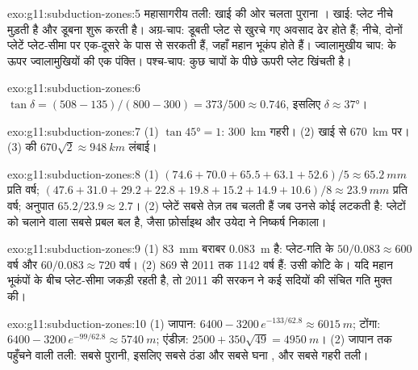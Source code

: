 \begin{solution}{exo:g11:subduction-zones:5}
महासागरीय तली: खाई की ओर चलता पुराना । खाई: प्लेट नीचे मुड़ती है
और डूबना शुरू करती है। अग्र-चाप: डूबती प्लेट से खुरचे गए अवसाद ढेर
होते हैं; नीचे, दोनों प्लेटें प्लेट-सीमा पर एक-दूसरे के पास से सरकती हैं,
जहाँ महान भूकंप होते हैं। ज्वालामुखीय चाप:  के ऊपर ज्वालामुखियों की
एक पंक्ति। पश्च-चाप: कुछ चापों के पीछे ऊपरी प्लेट खिंचती है।
\end{solution}

\begin{solution}{exo:g11:subduction-zones:6}
$\tan\delta = (508 - 135)/(800 - 300) = 373/500 \approx 0.746$, इसलिए
$\delta \approx \ang{37}$।
\end{solution}

\begin{solution}{exo:g11:subduction-zones:7}
(1) $\tan\ang{45} = 1$: \qty{300}{km} गहरी। (2) खाई से \qty{670}{km}
पर। (3)  की $670\sqrt{2} \approx \qty{948}{km}$ लंबाई।
\end{solution}

\begin{solution}{exo:g11:subduction-zones:8}
(1) $(74.6 + 70.0 + 65.5 + 63.1 + 52.6)/5 \approx \qty{65.2}{mm}$ प्रति वर्ष;
$(47.6 + 31.0 + 29.2 + 22.8 + 19.8 + 15.2 + 14.9 + 10.6)/8 \approx
\qty{23.9}{mm}$ प्रति वर्ष; अनुपात $65.2/23.9 \approx 2.7$। (2) प्लेटें
सबसे तेज़ तब चलती हैं जब उनसे कोई  लटकती है:  प्लेटों को
चलाने वाला सबसे प्रबल बल है, जैसा फ़ोर्साइथ और उयेदा ने निष्कर्ष निकाला।
\end{solution}

\begin{solution}{exo:g11:subduction-zones:9}
(1) \qty{83}{mm} बराबर \qty{0.083}{m} है: प्लेट-गति के $50/0.083 \approx 600$ वर्ष और
$60/0.083 \approx 720$ वर्ष। (2) 869 से 2011 तक 1142
वर्ष हैं: उसी कोटि के। यदि महान भूकंपों के बीच प्लेट-सीमा जकड़ी रहती है,
तो 2011 की सरकन ने कई सदियों की संचित गति मुक्त की।
\end{solution}

\begin{solution}{exo:g11:subduction-zones:10}
(1) जापान: $6400 - 3200\,e^{-133/62.8} \approx \qty{6015}{m}$; टोंगा:
$6400 - 3200\,e^{-99/62.8} \approx \qty{5740}{m}$; एंडीज़:
$2500 + 350\sqrt{49} = \qty{4950}{m}$। (2) जापान तक पहुँचने वाली तली: सबसे
पुरानी, इसलिए सबसे ठंडा और सबसे घना , और सबसे गहरी तली।
\end{solution}


